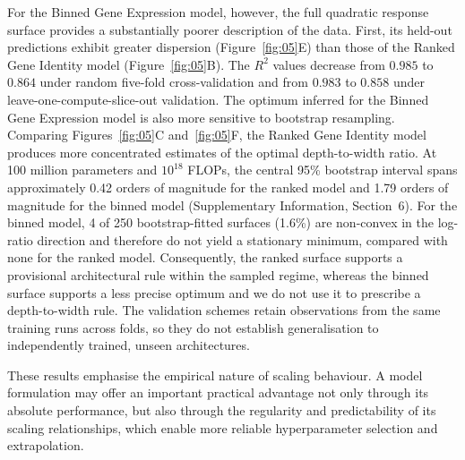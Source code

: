 \documentclass[pdflatex,sn-nature]{sn-jnl}%
\theoremstyle{thmstyleone}%
\theoremstyle{thmstyletwo}%
\theoremstyle{thmstylethree}%
\begin{document}
For the Binned Gene Expression model, however, the full quadratic response surface provides a substantially poorer description of the data.
First, its held-out predictions exhibit greater dispersion (Figure~\ref{fig:05}E) than those of the Ranked Gene Identity model (Figure~\ref{fig:05}B).
The \(R^2\) values decrease from \(0.985\) to \(0.864\) under random five-fold cross-validation and from \(0.983\) to \(0.858\) under leave-one-compute-slice-out validation.
The optimum inferred for the Binned Gene Expression model is also more sensitive to bootstrap resampling.
Comparing Figures~\ref{fig:05}C and~\ref{fig:05}F, the Ranked Gene Identity model produces more concentrated estimates of the optimal depth-to-width ratio. At 100 million parameters and $10^{18}$ FLOPs, the central 95\% bootstrap interval spans approximately 0.42 orders of magnitude for the ranked model and 1.79 orders of magnitude for the binned model (Supplementary Information, Section~6).
For the binned model, 4 of 250 bootstrap-fitted surfaces (1.6\%) are non-convex in the log-ratio direction and therefore do not yield a stationary minimum, compared with none for the ranked model.
Consequently, the ranked surface supports a provisional architectural rule within the sampled regime, whereas the binned surface supports a less precise optimum and we do not use it to prescribe a depth-to-width rule.
The validation schemes retain observations from the same training runs across folds, so they do not establish generalisation to independently trained, unseen architectures.

These results emphasise the empirical nature of scaling behaviour. A model formulation may offer an important practical advantage not only through its absolute performance, but also through the regularity and predictability of its scaling relationships, which enable more reliable hyperparameter selection and extrapolation.
\end{document}
